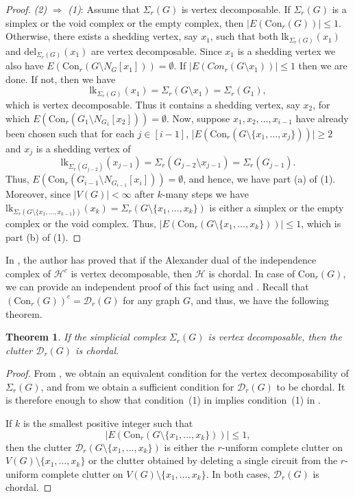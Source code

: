 \documentclass[12pt,reqno]{amsart}
\newtheorem{theorem}[proposition]{Theorem}
\theoremstyle{definition}
\newcommand{\lk}{{\mathrm{lk}}}
\newcommand{\del}{{\mathrm{del}}}
\newcommand{\Con}{{\mathrm{Con}}}
\def\H{\mathcal{H}}
\def\D{\mathcal{D}}
\def\del{\mathrm{del}}
\begin{document}
\begin{proof}
		\medskip\noindent	
		\emph{(2)} $\Rightarrow$ \emph{(1)}: Assume that $\Sigma_r(G)$ is vertex decomposable. If $\Sigma_r(G)$ is a simplex or the void complex or the empty complex, then $|E(\Con_r(G))|\le 1$. Otherwise, there exists a shedding vertex, say $x_1$, such that both $\lk_{\Sigma_r(G)}(x_1)$ and $\del_{\Sigma_r(G)}(x_1)$ are vertex decomposable. Since $x_1$ is a shedding vertex we also have $E(\Con_r(G \setminus N_G[x_1])) = \emptyset$. If $|E(Con_r(G\setminus x_1))| \le 1$ then we are done. If not, then we have \[
        \lk_{\Sigma_r(G)}(x_1)=\Sigma_r(G \setminus x_1)=\Sigma_r(G_1),\]
        which is vertex decomposable. Thus it contains a shedding vertex, say $x_2$, for which $E(\Con_r(G_1 \setminus N_{G_1}[x_2])) = \emptyset$. Now, suppose $x_1, x_2, \ldots, x_{i-1}$ have already been chosen such that for each $j\in [i-1]$, |$E(\Con_r(G\setminus\{x_1,\ldots,x_{j}\}))|\ge 2$ and  $x_j$ is a shedding vertex of 
        \[
        \lk_{\Sigma_r(G_{j-2})}(x_{j-1})=\Sigma_r(G_{j-2} \setminus x_{j-1})=\Sigma_r(G_{j-1}).
        \]
        Thus, $E(\Con_r(G_{i-1} \setminus N_{G_{i-1}}[x_i])) = \emptyset$, and hence, we have part (a) of (1). Moreover, since $|V(G)|<\infty$ after $k$-many steps we have $\lk_{\Sigma_r(G \setminus \{x_1, \ldots, x_{k-1}\})}(x_k) = \Sigma_r(G \setminus \{x_1, \ldots, x_k\})$ is either a simplex or the empty complex or the void complex. Thus, $|E(\Con_r(G\setminus\{x_1,\ldots,x_k\})) | \le 1$, which is part (b) of (1). 
	\end{proof}	


In \cite[Theorem 3.10]{CCVD}, the author has proved that if the Alexander dual of the independence complex of $\H^{c}$ is vertex decomposable, then $\H$ is chordal. In case of $\Con_r(G)$, we can provide an independent proof of this fact using  and . Recall that $(\Con_r(G))^{c} = \D_r(G)$ for any graph $G$, and thus, we have the following theorem. 

\begin{theorem}\label{V.D implies chordality}
    If the simplicial complex $\Sigma_r(G)$ is vertex decomposable, then the clutter $\D_r(G)$ is chordal. 
\end{theorem}
\begin{proof}
   From , we obtain an equivalent condition for the vertex decomposability of $\Sigma_r(G)$, and from  we obtain a sufficient condition for $\D_r(G)$ to be chordal. It is therefore enough to show that condition~(1) in  implies condition~(1) in . 

If $k$ is the smallest positive integer such that
\[
    |E(\Con_r(G \setminus \{x_1,\ldots,x_k\}))| \le 1,
\]
then the clutter $\D_r(G \setminus \{x_1,\ldots,x_k\})$ is either the $r$-uniform complete clutter on $V(G) \setminus \{x_1,\ldots,x_k\}$ or the clutter obtained by deleting a single circuit from the $r$-uniform complete clutter on $V(G) \setminus \{x_1,\ldots,x_k\}$. In both cases, $\D_r(G)$ is chordal.

\end{proof}
\end{document}
